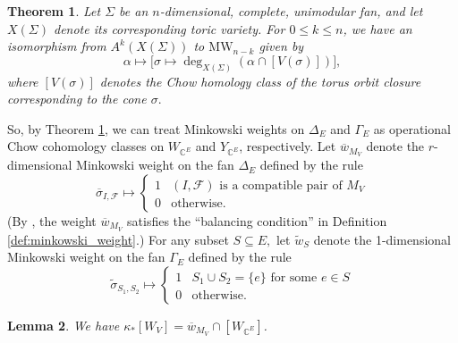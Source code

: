 \documentclass{amsart}
\theoremstyle{plain}
\newtheorem{theorem}{Theorem}[section]
\newtheorem{lemma}[theorem]{Lemma}
\theoremstyle{definition}
\begin{document}
\begin{theorem}
\label{thm:fulton_sturmfels_iso}
\cite[Theorem 3.1]{fulton_sturmfels}
Let $\Sigma$ be an $n$-dimensional, complete, unimodular fan, and let $X(\Sigma)$ denote its corresponding toric variety. For $0 \leq k \leq n$, we have an isomorphism from $A^{k}(X(\Sigma))$ to $\mathrm{MW}_{n-k}$ given by
\begin{equation*}
\label{eq:chow_minkowski_iso}
\alpha\mapsto \Big[\sigma \mapsto\deg_{X(\Sigma)}(\alpha \cap [V(\sigma)])\Big],
\end{equation*}
where $[V(\sigma)]$ denotes the Chow homology class of the torus orbit closure corresponding to the cone $\sigma.$
\end{theorem}

So, by Theorem \ref{thm:fulton_sturmfels_iso}, we can treat Minkowski weights on $\Delta_E$ and $\Gamma_E$ as operational Chow cohomology classes on $W_{\mathbb{C}^E}$ and $Y_{\mathbb{C}^E}$, respectively. Let $\overline{w}_{M_V}$ denote the $r$-dimensional Minkowski weight on the fan $\Delta_E$ defined by the rule
\[\overline{\sigma}_{I, \mathscr{F}} \mapsto 
\begin{cases}
    1 & (I, \mathscr{F}) \text{ is a compatible pair of } M_V \\
    0 & \text{otherwise}.
\end{cases}\]
(By \cite[Proposition 2.8]{semismall}, the weight $\overline{w}_{M_V}$ satisfies the ``balancing condition'' in Definition \ref{def:minkowski_weight}.)
For any subset $S \subseteq E,$ let $\tilde{w}_S$ denote the 1-dimensional Minkowski weight on the fan $\Gamma_E$ defined by the rule
\[\tilde{\sigma}_{S_1,S_2} \mapsto 
\begin{cases}
    1 & S_1 \cup S_2 = \{e\} \text{ for some } e \in S \\   
    0 & \text{otherwise}.
\end{cases}\]

\begin{lemma}
\label{lem:pushforward_wonderful_model}
\cite[Corollary 5.11]{stellahedral}
We have $\kappa_*[W_V] = \overline{w}_{M_V} \cap [W_{\mathbb{C}^E}]$.
\end{lemma}
\end{document}
